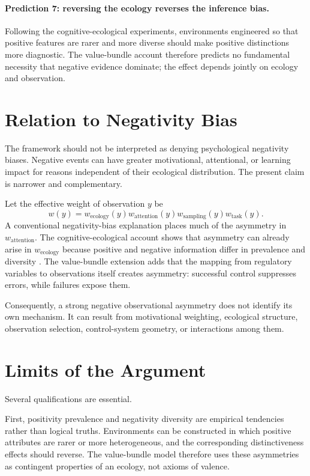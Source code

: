 \documentclass[11pt]{article}
\begin{document}
\paragraph{Prediction 7: reversing the ecology reverses the inference bias.}
Following the cognitive-ecological experiments, environments engineered so that positive features are rarer and more diverse should make positive distinctions more diagnostic. The value-bundle account therefore predicts no fundamental necessity that negative evidence dominate; the effect depends jointly on ecology and observation.

\section{Relation to Negativity Bias}

The framework should not be interpreted as denying psychological negativity biases. Negative events can have greater motivational, attentional, or learning impact for reasons independent of their ecological distribution. The present claim is narrower and complementary.

Let the effective weight of observation $y$ be
\begin{equation}
    w(y)
    =
    w_{\mathrm{ecology}}(y)
    w_{\mathrm{attention}}(y)
    w_{\mathrm{sampling}}(y)
    w_{\mathrm{task}}(y).
\end{equation}
A conventional negativity-bias explanation places much of the asymmetry in $w_{\mathrm{attention}}$. The cognitive-ecological account shows that asymmetry can already arise in $w_{\mathrm{ecology}}$ because positive and negative information differ in prevalence and diversity \citep{AlvesKochUnkelbach2017Good,UnkelbachKochAlves2019}. The value-bundle extension adds that the mapping from regulatory variables to observations itself creates asymmetry: successful control suppresses errors, while failures expose them.

Consequently, a strong negative observational asymmetry does not identify its own mechanism. It can result from motivational weighting, ecological structure, observation selection, control-system geometry, or interactions among them.

\section{Limits of the Argument}

Several qualifications are essential.

First, positivity prevalence and negativity diversity are empirical tendencies rather than logical truths. Environments can be constructed in which positive attributes are rarer or more heterogeneous, and the corresponding distinctiveness effects should reverse. The value-bundle model therefore uses these asymmetries as contingent properties of an ecology, not axioms of valence.
\end{document}
